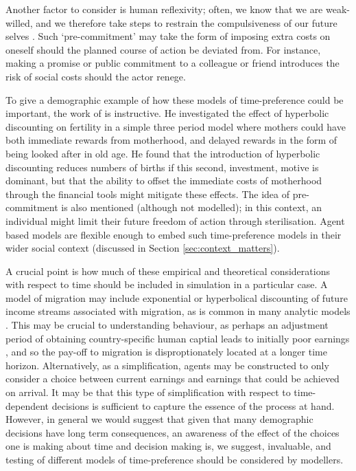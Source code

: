 \documentclass{article}
\begin{document}
Another factor to consider is human reflexivity; often, we know that we are weak-willed, and we therefore take steps to restrain the compulsiveness of our future selves \citep{ODonoghue2000}. Such `pre-commitment' may take the form of imposing extra costs on oneself should the planned course of action be deviated from. For instance, making a promise or public commitment to a colleague or friend introduces the risk of social costs should the actor renege. 

To give a demographic example of how these models of time-preference could be important, the work of  \cite{Wrede2011} is instructive. He investigated the effect of hyperbolic discounting on fertility in a simple three period model where mothers could have both immediate rewards from motherhood, and delayed rewards in the form of being looked after in old age. He found that the introduction of hyperbolic discounting reduces numbers of births if this second, investment, motive is dominant, but that the ability to offset the immediate costs of motherhood through the financial tools might mitigate these effects. The idea of pre-commitment is also mentioned (although not modelled); in this context, an individual might limit their future freedom of action through sterilisation. Agent based models are flexible enough to embed such time-preference models in their wider social context (discussed in Section \ref{sec:context_matters}).

A crucial point is how much of these empirical and theoretical considerations with respect to time should be included in simulation in a particular case. A model of migration may include exponential or hyperbolical discounting of future income streams associated with migration, as is common in many analytic models \citep{Carrington1996}. This may be crucial to understanding behaviour, as perhaps an adjustment period of obtaining country-specific human captial leads to initially poor earnings \citep{Dustmann2011}, and so the pay-off to migration is disproptionately located at a longer time horizon. Alternatively, as a simplification, agents may be constructed to only consider a choice between current earnings and earnings that could be achieved on arrival. It may be that this type of simplification with respect to time-dependent decisions is sufficient to capture the essence of the process at hand. However, in general we would suggest that given that many demographic decisions have long term consequences, an awareness of the effect of the choices one is making about time and decision making is, we suggest, invaluable, and testing of different models of time-preference should be considered by modellers. 
\end{document}
